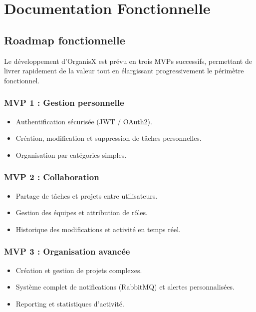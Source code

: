 \chapter{Documentation Fonctionnelle}

\section{Roadmap fonctionnelle}

Le développement d’OrganisX est prévu en trois MVPs successifs, permettant de livrer rapidement de la valeur tout en élargissant progressivement le périmètre fonctionnel.

\subsection{MVP 1 : Gestion personnelle}
\begin{itemize}
	\item Authentification sécurisée (JWT / OAuth2).
	\item Création, modification et suppression de tâches personnelles.
	\item Organisation par catégories simples.
\end{itemize}

\subsection{MVP 2 : Collaboration}
\begin{itemize}
	\item Partage de tâches et projets entre utilisateurs.
	\item Gestion des équipes et attribution de rôles.
	\item Historique des modifications et activité en temps réel.
\end{itemize}

\subsection{MVP 3 : Organisation avancée}
\begin{itemize}
	\item Création et gestion de projets complexes.
	\item Système complet de notifications (RabbitMQ) et alertes personnalisées.
	\item Reporting et statistiques d’activité.
\end{itemize}









